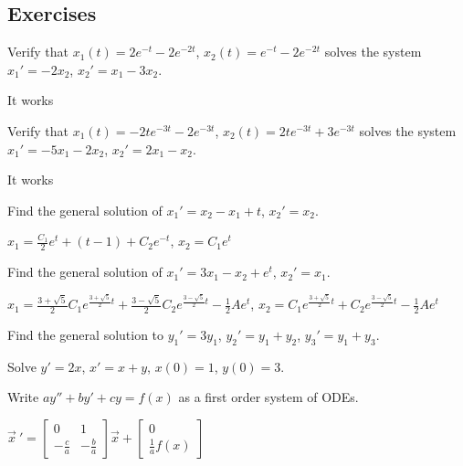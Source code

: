 \subsection{Exercises}

\begin{exercise}
Verify that $x_1(t) = 2e^{-t} - 2e^{-2t}$, $x_2(t) = e^{-t} - 2e^{-2t}$ solves the system $x_1' = - 2x_2 $, $x_2' = x_1 - 3x_2$.  
\end{exercise}
\comboSol{%
}
{%
It works
}

\begin{exercise}
Verify that $x_1(t) = -2te^{-3t} - 2e^{-3t}$, $x_2(t) = 2te^{-3t} + 3e^{-3t}$ solves the system $x_1' = -5x_1 - 2x_2 $, $x_2' = 2x_1 - x_2$.  
\end{exercise}
\comboSol{%
}
{%
It works
}

\begin{exercise}
Find the general solution of $x_1' = x_2 - x_1 + t$, $x_2' = x_2$.
\end{exercise}
\comboSol{%
}
{%
$x_1 = \frac{C_1}{2}e^t + (t-1) + C_2e^{-t}$, $x_2 = C_1e^t$
}

\begin{exercise}
Find the general solution of $x_1' = 3 x_1 - x_2 + e^t$, $x_2' = x_1$.
\end{exercise}
\comboSol{%
}
{%
$x_1 = \frac{3+\sqrt{5}}{2}C_1e^{\frac{3+\sqrt{5}}{2}t} + \frac{3-\sqrt{5}}{2}C_2e^{\frac{3-\sqrt{5}}{2}t} - \frac{1}{2}Ae^t$, $x_2 = C_1e^{\frac{3+\sqrt{5}}{2}t} + C_2e^{\frac{3-\sqrt{5}}{2}t} - \frac{1}{2}Ae^t$
}

\begin{exercise}\ansMark%
Find the general solution to $y_1' = 3 y_1$, $y_2' = y_1 + y_2$,
$y_3' = y_1 + y_3$.
\end{exercise}

\begin{exercise}\ansMark%
Solve $y'=2x$, $x'=x+y$, $x(0)=1$, $y(0)=3$.
\end{exercise}


\begin{exercise}
Write $ay'' + by' + cy = f(x)$
as a first order system of ODEs.
\end{exercise}
\comboSol{%
}
{%
$\vec{x}\ ' = \left[\begin{smallmatrix} 0 & 1 \\ -\frac{c}{a} & -\frac{b}{a} \end{smallmatrix}\right] \vec{x} + \left[\begin{smallmatrix}  0 \\ \frac{1}{a}f(x) \end{smallmatrix}\right]$
}

